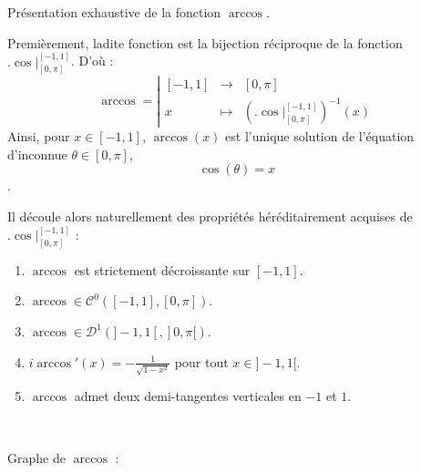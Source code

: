 \documentclass{article}
\begin{document}
\begin{question_kholle}{Présentation exhaustive de la fonction $\arccos$.}

    Premièrement, ladite fonction est la bijection réciproque de la fonction $\bigl.\cos\bigr|_{[0,\pi]}^{[-1,1]}$. D'où :
    \[
        \arccos = \left|
        \begin{array}{rcl}
            [-1,1] & \to     & [0 , \pi]                                                 \\ [1ex]
            x      & \mapsto & \left( \bigl.\cos\bigr|_{[0,\pi]}^{[-1,1]}\right)^{-1}(x)
        \end{array}
        \right.
    \]
    Ainsi, pour $x\in [-1,1]$, $\arccos (x)$ est l'unique solution de l'équation d'inconnue $\theta \in \textstyle [0 ,\pi]$, \[\cos(\theta) = x\].

    \noindent Il découle alors naturellement des propriétés héréditairement acquises de $\bigl.\cos\bigr|_{[0,\pi]}^{[-1,1]}$ :

    \begin{enumerate}
        \item $\arccos$ est strictement décroissante sur $[-1,1]$.
        \item $\arccos \in \mathcal{C}^0\left([-1,1],[0 , \pi] \right)$.
        \item $\arccos \in \mathcal{D}^1\left(]-1,1[,]0 ,\pi [ \right)$.
        \item $i\displaystyle\arccos'(x) = -\frac{1}{\sqrt{1-x^2}}$ pour tout $x\in]-1,1[$.
        \item $\arccos$ admet deux demi-tangentes verticales en $-1$ et $1$.
    \end{enumerate}

    \

    Graphe de $\arccos$ :
    \begin{figure}[H]
        \centering
\end{figure}
\end{question_kholle}
\end{document}
